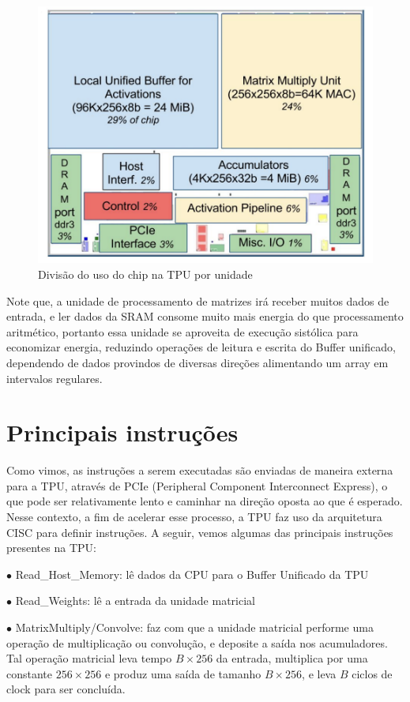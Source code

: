 \documentclass{report}
\begin{document}
\begin{figure}[h]
	\includegraphics[scale=0.7]{floor-plan}
	\centering
	\caption{Divisão do uso do chip na TPU por unidade}
\end{figure}

Note que, a unidade de processamento de matrizes irá receber muitos dados de entrada, e ler dados da SRAM consome muito mais energia do que processamento aritmético, portanto essa unidade se aproveita de execução sistólica para economizar energia, reduzindo operações de leitura e escrita do Buffer unificado, dependendo de dados provindos de diversas direções alimentando um array em intervalos regulares.

\section{Principais instruções}

Como vimos, as instruções a serem executadas são enviadas de maneira externa para a TPU, através de PCIe (Peripheral Component Interconnect Express), o que pode ser relativamente lento e caminhar na direção oposta ao que é esperado. Nesse contexto, a fim de acelerar esse processo, a TPU faz uso da arquitetura CISC para definir instruções. A seguir, vemos algumas das principais instruções presentes na TPU:

$\bullet$ Read\_Host\_Memory: lê dados da CPU para o Buffer Unificado da TPU

$\bullet$ Read\_Weights: lê a entrada da unidade matricial

$\bullet$ MatrixMultiply/Convolve: faz com que a unidade matricial performe uma operação de multiplicação ou convolução, e deposite a saída nos acumuladores. Tal operação matricial leva tempo $B \times 256$ da entrada, multiplica por uma constante $256 \times 256$ e produz uma saída de tamanho $B \times 256$, e leva $B$ ciclos de clock para ser concluída.
\end{document}
